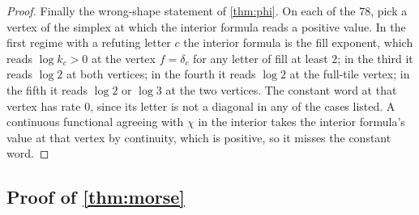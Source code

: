 \documentclass[11pt]{amsart}
\theoremstyle{definition}
\theoremstyle{remark}
\begin{document}
\begin{proof}
Finally the wrong-shape statement of \cref{thm:phi}. On each of the $78$, pick a vertex of the simplex at which the interior formula reads a positive value. In the first regime with a refuting letter $c$ the interior formula is the fill exponent, which reads $\log k_c > 0$ at the vertex $f = \delta_c$ for any letter of fill at least $2$; in the third it reads $\log 2$ at both vertices; in the fourth it reads $\log 2$ at the full-tile vertex; in the fifth it reads $\log 2$ or $\log 3$ at the two vertices. The constant word at that vertex has rate $0$, since its letter is not a diagonal in any of the cases listed. A continuous functional agreeing with $\chi$ in the interior takes the interior formula's value at that vertex by continuity, which is positive, so it misses the constant word.
\end{proof}

\subsection{Proof of \texorpdfstring{\cref{thm:morse}}{the Thue-Morse value}}
\end{document}
